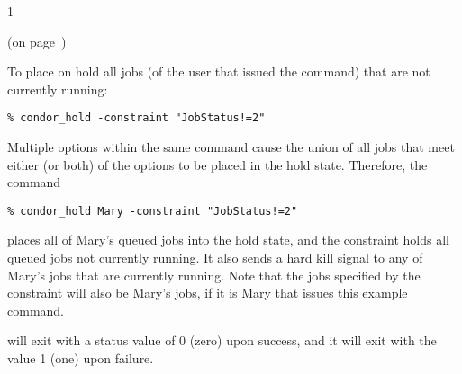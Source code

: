 \begin{ManPage}{\label{man-condor-hold}}{1}
\begin{Options}
\end{Options}

\SeeAlso
{} (on page~\pageref{man-condor-release})

\Examples
To place on hold all jobs
(of the user that issued the  command)
that are not currently running:
\footnotesize
\begin{verbatim}
% condor_hold -constraint "JobStatus!=2"
\end{verbatim}
\normalsize

Multiple options within the same command cause the union of 
all jobs that meet either (or both) of the options to be placed in the
hold state.
Therefore, the command
\footnotesize
\begin{verbatim}
% condor_hold Mary -constraint "JobStatus!=2"
\end{verbatim}
\normalsize
places all of Mary's queued jobs into the hold state, 
and the constraint holds all queued jobs not currently running.
It also sends a hard kill signal to any of Mary's jobs that are
currently running.
Note that the jobs specified by the constraint will also be
Mary's jobs, if it is Mary that issues this
example  command.

\ExitStatus

 will exit with a status value of 0 (zero) upon success,
and it will exit with the value 1 (one) upon failure.

\end{ManPage}
